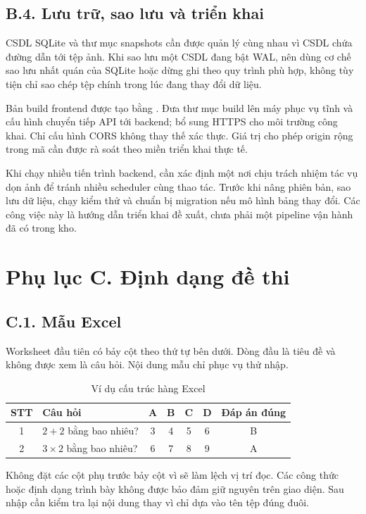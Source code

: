 \section*{B.4. Lưu trữ, sao lưu và triển khai}
CSDL SQLite và thư mục snapshots cần được quản lý cùng nhau vì CSDL chứa đường dẫn tới tệp ảnh. Khi sao lưu một CSDL đang bật WAL, nên dùng cơ chế sao lưu nhất quán của SQLite hoặc dừng ghi theo quy trình phù hợp, không tùy tiện chỉ sao chép tệp chính trong lúc đang thay đổi dữ liệu.

Bản build frontend được tạo bằng . Đưa thư mục build lên máy phục vụ tĩnh và cấu hình chuyển tiếp API tới backend; bổ sung HTTPS cho môi trường công khai. Chỉ cấu hình CORS không thay thế xác thực. Giá trị cho phép origin rộng trong mã cần được rà soát theo miền triển khai thực tế.

Khi chạy nhiều tiến trình backend, cần xác định một nơi chịu trách nhiệm tác vụ dọn ảnh để tránh nhiều scheduler cùng thao tác. Trước khi nâng phiên bản, sao lưu dữ liệu, chạy kiểm thử và chuẩn bị migration nếu mô hình bảng thay đổi. Các công việc này là hướng dẫn triển khai đề xuất, chưa phải một pipeline vận hành đã có trong kho.

\chapter*{Phụ lục C. Định dạng đề thi}
\setcounter{table}{0}
\renewcommand{\theHtable}{appendixC.\arabic{table}}
\setcounter{lstlisting}{0}
\section*{C.1. Mẫu Excel}
Worksheet đầu tiên có bảy cột theo thứ tự bên dưới. Dòng đầu là tiêu đề và không được xem là câu hỏi. Nội dung mẫu chỉ phục vụ thử nhập.
\begin{table}[htbp]
\centering\small
\caption{Ví dụ cấu trúc hàng Excel}
\begin{tabularx}{\textwidth}{@{}cXccccc@{}}\toprule
STT & Câu hỏi & A & B & C & D & Đáp án đúng\\\midrule
1 & $2+2$ bằng bao nhiêu? & 3 & 4 & 5 & 6 & B\\
2 & $3\times2$ bằng bao nhiêu? & 6 & 7 & 8 & 9 & A\\\bottomrule
\end{tabularx}
\end{table}
Không đặt các cột phụ trước bảy cột vì sẽ làm lệch vị trí đọc. Các công thức hoặc định dạng trình bày không được bảo đảm giữ nguyên trên giao diện. Sau nhập cần kiểm tra lại nội dung thay vì chỉ dựa vào tên tệp đúng đuôi.

